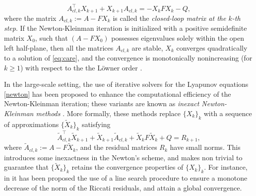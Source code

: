 \documentclass[a4paper,10pt]{article}
\begin{document}
\begin{equation}
A_{cl,k}^\top X_{k+1} + X_{k+1} A_{cl,k}= -X_k F X_k-Q,
\label{newton}
\end{equation}
where the matrix  $A_{cl,k}:= A-F X_k$  is called the \emph{closed-loop matrix at the $k$-th step}.
If the Newton-Kleinman iteration is initialized with a positive semidefinite  matrix $X_0$, such that $(A-F X_0)$ possesses eigenvalues solely within the open left half-plane, then all the  matrices $A_{cl,k}$ are stable, $X_k$ converges quadratically to a solution of \eqref{eq:care}, and the convergence is monotonically nonincreasing (for $k\ge 1$) with respect to the the L\"owner order \cite[Theorem 3.1]{bini2011numerical}.  

In the large-scale setting, the use of iterative solvers for the Lyapunov equations \eqref{newton} has been proposed to enhance the computational efficiency of the Newton-Kleinman iteration; these variants are known as \emph{inexact Newton-Kleinman methods} \cite{feitzinger2009inexact,benner2016inexact}. More formally, these methods replace $\{X_k\}_k$ with a sequence of approximations $\{\widetilde X_k\}_k$ satisfying
\begin{equation}
	\tilde{A}_{cl,k}^\top  \tilde{X}_{k+1} + \tilde{X}_{k+1} \tilde{A}_{cl,k} +   \tilde{X}_{k} F \tilde{X}_{k}+Q = R_{k+1},
	\label{inexactNK}
\end{equation}
where $\tilde{A}_{cl,k}:=A-F\tilde X_k$, and the residual matrices $R_k$ have small norms.
This introduces some inexactness in the Newton's scheme, and makes non trivial to guarantee that $\{\tilde{X}_k\}_k$ retains the convergence properties of $\{X_k\}_k$. For instance, in \cite{benner2016inexact} it has been proposed the use of a line search procedure to ensure a monotone decrease of the norm of the Riccati residuals, and attain a global convergence.
\end{document}
